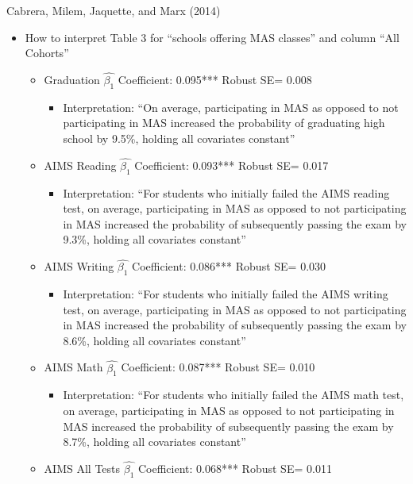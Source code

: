 \documentclass[8pt,ignorenonframetext,dvipsnames]{beamer}
\providecommand{\tightlist}{%
  \setlength{\itemsep}{0pt}\setlength{\parskip}{0pt}}
\let\olditem\item
\renewcommand{\item}{%
  \olditem\vspace{4pt}
}
\begin{document}
\begin{frame}{Cabrera, Milem, Jaquette, and Marx (2014)}
\protect\hypertarget{cabrera-milem-jaquette-and-marx-2014-2}{}

\begin{itemize}
\tightlist
\item
  How to interpret Table 3 for ``schools offering MAS classes'' and
  column ``All Cohorts''

  \begin{itemize}
  \tightlist
  \item
    Graduation \(\hat{\beta_1}\) Coefficient: 0.095*** Robust SE= 0.008

    \begin{itemize}
    \tightlist
    \item
      Interpretation: ``On average, participating in MAS as opposed to
      not participating in MAS increased the probability of graduating
      high school by 9.5\%, holding all covariates constant''
    \end{itemize}
  \item
    AIMS Reading \(\hat{\beta_1}\) Coefficient: 0.093*** Robust SE=
    0.017

    \begin{itemize}
    \tightlist
    \item
      Interpretation: ``For students who initially failed the AIMS
      reading test, on average, participating in MAS as opposed to not
      participating in MAS increased the probability of subsequently
      passing the exam by 9.3\%, holding all covariates constant''
    \end{itemize}
  \item
    AIMS Writing \(\hat{\beta_1}\) Coefficient: 0.086*** Robust SE=
    0.030

    \begin{itemize}
    \tightlist
    \item
      Interpretation: ``For students who initially failed the AIMS
      writing test, on average, participating in MAS as opposed to not
      participating in MAS increased the probability of subsequently
      passing the exam by 8.6\%, holding all covariates constant''
    \end{itemize}
  \item
    AIMS Math \(\hat{\beta_1}\) Coefficient: 0.087*** Robust SE= 0.010

    \begin{itemize}
    \tightlist
    \item
      Interpretation: ``For students who initially failed the AIMS math
      test, on average, participating in MAS as opposed to not
      participating in MAS increased the probability of subsequently
      passing the exam by 8.7\%, holding all covariates constant''
    \end{itemize}
  \item
    AIMS All Tests \(\hat{\beta_1}\) Coefficient: 0.068*** Robust SE=
    0.011


\end{itemize}
\end{itemize}
\end{frame}
\end{document}
